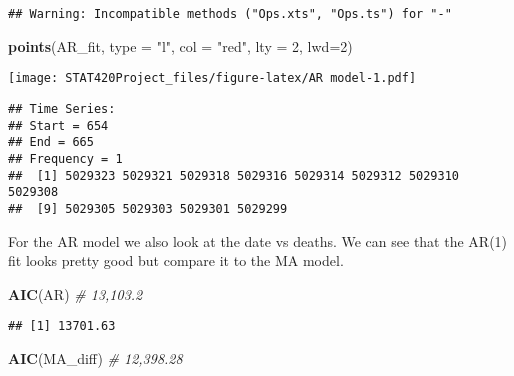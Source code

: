 \documentclass[]{article}
\newenvironment{Shaded}{\begin{snugshade}}{\end{snugshade}}
\newcommand{\CommentTok}[1]{\textcolor[rgb]{0.56,0.35,0.01}{\textit{#1}}}
\newcommand{\DataTypeTok}[1]{\textcolor[rgb]{0.13,0.29,0.53}{#1}}
\newcommand{\DecValTok}[1]{\textcolor[rgb]{0.00,0.00,0.81}{#1}}
\newcommand{\KeywordTok}[1]{\textcolor[rgb]{0.13,0.29,0.53}{\textbf{#1}}}
\newcommand{\NormalTok}[1]{#1}
\newcommand{\OperatorTok}[1]{\textcolor[rgb]{0.81,0.36,0.00}{\textbf{#1}}}
\newcommand{\StringTok}[1]{\textcolor[rgb]{0.31,0.60,0.02}{#1}}
\begin{document}
\begin{verbatim}
## Warning: Incompatible methods ("Ops.xts", "Ops.ts") for "-"
\end{verbatim}

\begin{Shaded}
\begin{Highlighting}[]
\KeywordTok{points}\NormalTok{(AR_fit, }\DataTypeTok{type =} \StringTok{"l"}\NormalTok{, }\DataTypeTok{col =} \StringTok{"red"}\NormalTok{, }\DataTypeTok{lty =} \DecValTok{2}\NormalTok{, }\DataTypeTok{lwd=}\DecValTok{2}\NormalTok{)}
\end{Highlighting}
\end{Shaded}

\texttt{[image: STAT420Project\_files/figure-latex/AR model-1.pdf]}

\begin{Shaded}
\end{Shaded}

\begin{verbatim}
## Time Series:
## Start = 654 
## End = 665 
## Frequency = 1 
##  [1] 5029323 5029321 5029318 5029316 5029314 5029312 5029310 5029308
##  [9] 5029305 5029303 5029301 5029299
\end{verbatim}

For the AR model we also look at the date vs deaths. We can see that the
AR(1) fit looks pretty good but compare it to the MA model.

\begin{Shaded}
\begin{Highlighting}[]
\KeywordTok{AIC}\NormalTok{(AR) }\CommentTok{# 13,103.2}
\end{Highlighting}
\end{Shaded}

\begin{verbatim}
## [1] 13701.63
\end{verbatim}

\begin{Shaded}
\begin{Highlighting}[]
\KeywordTok{AIC}\NormalTok{(MA_diff)  }\CommentTok{# 12,398.28}
\end{Highlighting}
\end{Shaded}
\end{document}
